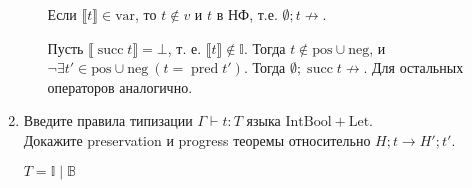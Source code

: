 \documentclass{article}
\DeclareMathOperator{\tsucc}{succ}
\DeclareMathOperator{\tpred}{pred}
\begin{document}
\begin{enumerate}
\begin{enumerate}
            Если $\llbracket t \rrbracket \in \mathrm{var}$, то $t\not\in v$ и $t$ в НФ, т.е. $\emptyset;t\not\to$.
            
            Пусть $\llbracket \tsucc t \rrbracket = \bot$, т. е. $\llbracket t \rrbracket \not\in \mathbb{I}$. Тогда $t\not\in \mathrm{pos}\cup\mathrm{neg}$, и $\neg\exists t'\in\mathrm{pos}\cup\mathrm{neg}\ (t=\tpred t')$. Тогда $\emptyset;\tsucc t\not\to$. Для остальных операторов аналогично.
        \end{enumerate}
        
    \item Введите правила типизации $\Gamma\vdash t:T$ языка $\mathrm{IntBool}+\mathrm{Let}$.\\
    Докажите preservation и progress теоремы относительно $H;t\to H';t'$.
        
        $T = \mathbb{I} \mid \mathbb{B}$
        

\end{enumerate}
\end{document}
